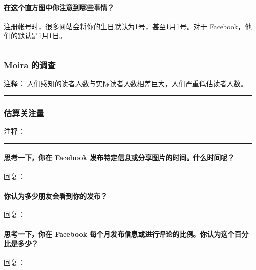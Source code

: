 \documentclass[]{article}
\let\oldparagraph\paragraph
\renewcommand{\paragraph}[1]{\oldparagraph{#1}\mbox{}}
\begin{document}
\paragraph{在这个直方图中你注意到哪些事情？}

注册帐号时，很多网站会将你的生日默认为1号，甚至1月1号。对于
Facebook，他们的默认是1月1日。

\begin{center}\rule{0.5\linewidth}{\linethickness}\end{center}

\hypertarget{moira-}{%
\subsubsection{Moira 的调查}\label{moira-}}

注释： 人们感知的读者人数与实际读者人数相差巨大，人们严重低估读者人数。

\begin{center}\rule{0.5\linewidth}{\linethickness}\end{center}

\subsubsection{估算关注量}

注释：

\begin{center}\rule{0.5\linewidth}{\linethickness}\end{center}

\hypertarget{-facebook-}{%
\paragraph{思考一下，你在 Facebook
发布特定信息或分享图片的时间。什么时间呢？}\label{-facebook-}}

回复：

\paragraph{你认为多少朋友会看到你的发布？}

回复：

\hypertarget{-facebook-}{%
\paragraph{思考一下，你在 Facebook
每个月发布信息或进行评论的比例。你认为这个百分比是多少？}\label{-facebook-}}

回复：
\end{document}
